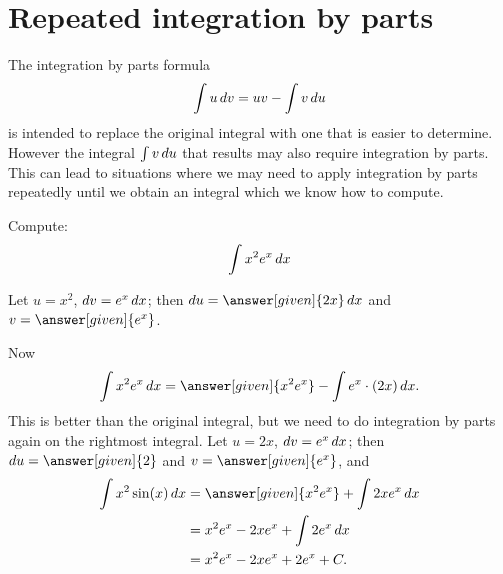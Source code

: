\documentclass[noauthor]{ximera}
\begin{document}
\section{Repeated integration by parts}

The  integration by parts formula
 \[
\int u \mathop{}\!d v= uv - \int v \mathop{}\!d u
\]
 is intended to replace the original integral with one that is easier to determine. However the integral $\int v \mathop{}\!d u$ that results may also require integration by parts. This can lead to situations where we may need to apply integration by parts repeatedly until we obtain an integral which we know how to compute.


%

\begin{example}
Compute:
\[
\int x^2e^x \mathop{}\!d x
\]
\begin{explanation}
Let $u=x^2$, $\mathop{}\!d v=e^x \mathop{}\!d x$; then $\d u=\answer[given]{2x}\d x$ and $v=\answer[given]{e^x}$.

Now
\[
\int x^2e^x\d x=\answer[given]{x^2e^x} - \int e^x\cdot (2x) \d x.
\]
This is better than the original integral, but we need to do
integration by parts again on the rightmost integral. Let $u=2x$, $\mathop{}\!d v=e^x \mathop{}\!d x$; then $\d u=\answer[given]{2}$
and $v=\answer[given]{e^x}$, and
\begin{align*}
  \int x^2\sin(x)\d x &=\answer[given]{x^2e^x}+\int 2xe^x\d x \\
  & = x^2e^x - 2xe^x + \int 2e^x \d x \\
  & = x^2e^x - 2xe^x + 2e^x + C.
\end{align*}
\end{explanation}
\end{example}
\end{document}
